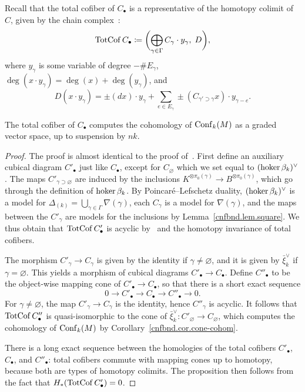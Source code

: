 Recall that the total cofiber of $C_{\bullet}$ is a representative of the homotopy colimit of $C$, given by the chain complex~\cite[Definition~7.2]{LambrechtsStanley2008a}:
\begin{equation}
  \operatorname{TotCof} C_{\bullet} \coloneqq \biggl( \bigoplus_{\gamma \in \Gamma} C_{\gamma} \cdot y_{\gamma}, \; D \biggl),
\end{equation}
where $y_{\gamma}$ is some variable of degree $- \# E_{\gamma}$, $\deg(x \cdot y_{\gamma}) = \deg(x) + \deg(y_{\gamma})$, and
\begin{equation}
  D(x \cdot y_{\gamma}) = \pm (dx) \cdot y_{\gamma} + \sum_{e \in E_{\gamma}} \pm (C_{\gamma' \supset \gamma} x) \cdot y_{\gamma - e}.
\end{equation}

\begin{proposition}
  The total cofiber of $C_{\bullet}$ computes the cohomology of $\operatorname{Conf}_{k}(M)$ as a graded vector space, up to suspension by $nk$.
\end{proposition}
\begin{proof}
  The proof is almost identical to the proof of~\cite[Theorem~9.2]{LambrechtsStanley2008a}.
  First define an auxiliary cubical diagram $C'_{\bullet}$ just like $C_{\bullet}$, except for $C_{\varnothing}$ which we set equal to $(\operatorname{hoker} \beta_{k})^{\vee}$.
  The maps $C'_{\gamma \supset \varnothing}$ are induced by the inclusions $K^{\otimes \pi_{0}(\gamma)} \to B^{\otimes \pi_{0}(\gamma)}$, which go through the definition of $\operatorname{hoker} \beta_{k}$.
  By Poincaré--Lefschetz duality, $(\operatorname{hoker} \beta_{k})^{\vee}$ is a model for $\Delta_{(k)} = \bigcup_{\gamma \in \Gamma} \nabla(\gamma)$, each $C_{\gamma}$ is a model for $\nabla(\gamma)$, and the maps between the $C'_{\gamma}$ are models for the inclusions by Lemma~\ref{cnfbnd.lem.square}.
  We thus obtain that $\operatorname{TotCof} C'_{\bullet}$ is acyclic by~\cite[Proposition~9.1]{LambrechtsStanley2008a} and the homotopy invariance of total cofibers.

  The morphism $C'_{\gamma} \to C_{\gamma}$ is given by the identity if $\gamma \neq \varnothing$, and it is given by $\bar{\xi}_{k}^{\vee}$ if $\gamma = \varnothing$.
  This yields a morphism of cubical diagrams $C'_{\bullet} \to C_{\bullet}$.
  Define $C''_{\bullet}$ to be the object-wise mapping cone of $C'_{\bullet} \to C_{\bullet}$, so that there is a short exact sequence
  \[ 0 \to C'_{\bullet} \to C_{\bullet} \to C''_{\bullet} \to 0. \]
  For $\gamma \neq \varnothing$, the map $C'_{\gamma} \to C_{\gamma}$ is the identity, hence $C''_{\gamma}$ is acyclic.
  It follows that $\operatorname{TotCof} C''_{\bullet}$ is quasi-isomorphic to the cone of $\bar{\xi}_{k}^{\vee} : C'_{\varnothing} \to C_{\varnothing}$, which computes the cohomology of $\operatorname{Conf}_{k}(M)$ by Corollary~\ref{cnfbnd.cor.cone-cohom}.

  There is a long exact sequence between the homologies of the total cofibers $C'_{\bullet}$, $C_{\bullet}$, and $C''_{\bullet}$: total cofibers commute with mapping cones up to homotopy, because both are types of homotopy colimits.
  The proposition then follows from the fact that $H_{*}(\operatorname{TotCof} C'_{\bullet}) = 0$.
\end{proof}

